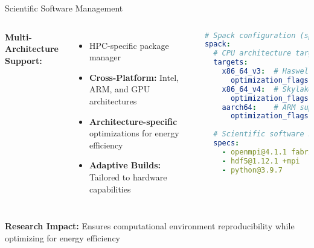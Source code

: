 \documentclass[aspectratio=169]{beamer}
\begin{document}
\begin{frame}[fragile]{Scientific Software Management}
  \begin{columns}
    \textbf{Multi-Architecture Support:}
    \begin{itemize}
      \item HPC-specific package manager
      \item \textbf{Cross-Platform:} Intel, ARM, and GPU architectures
      \item \textbf{Architecture-specific} optimizations for energy efficiency
      \item \textbf{Adaptive Builds:} Tailored to hardware capabilities
    \end{itemize}
    
    \begin{lstlisting}[language=yaml]
# Spack configuration (spack.yaml)
spack:
  # CPU architecture targeting
  targets:
    x86_64_v3:  # Haswell, Broadwell
      optimization_flags: -O3 -march=haswell
    x86_64_v4:  # Skylake-AVX512
      optimization_flags: -O3 -march=skylake-avx512
    aarch64:    # ARM support
      optimization_flags: -O3 -mcpu=native
  
  # Scientific software specs
  specs:
    - openmpi@4.1.1 fabrics=ucx
    - hdf5@1.12.1 +mpi
    - python@3.9.7
    \end{lstlisting}
  \end{columns}
  
  \vspace{0.6cm}
  \textbf{Research Impact:} Ensures computational environment reproducibility while optimizing for energy efficiency
\end{frame}
\end{document}
